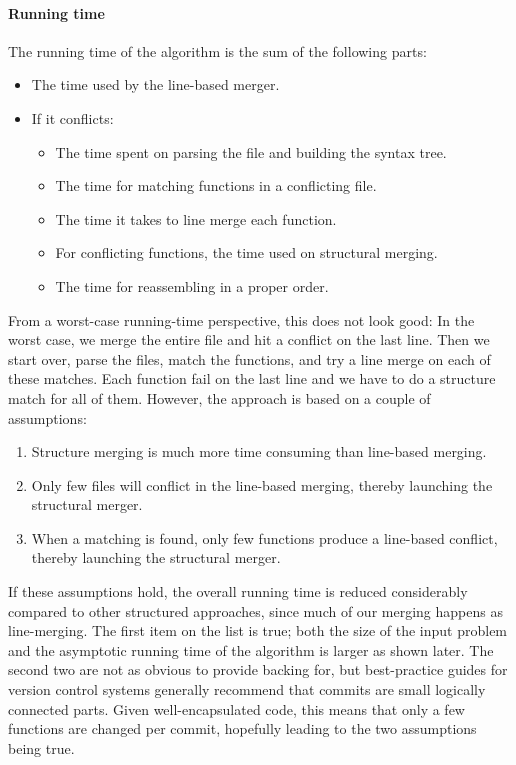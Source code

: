 \documentclass[11pt]{article}
\begin{document}
\paragraph{Running time} The running time of the algorithm is the sum of the following parts:

\begin{itemize}
\item The time used by the line-based merger.
\item If it conflicts:
\begin{itemize}
\item The time spent on parsing the file and building the syntax tree.
\item The time for matching functions in a conflicting file.
\item The time it takes to line merge each function.
\item For conflicting functions, the time used on structural merging.
\item The time for reassembling in a proper order.
\end{itemize}
\end{itemize}

From a worst-case running-time perspective, this does not look good: In the worst case, we merge the entire file and hit a conflict on the last line. Then we start over, parse the files, match the functions, and try a line merge on each of these matches. Each function fail on the last line and we have to do a structure match for all of them. However, the approach is based on a couple of assumptions:

\begin{enumerate}
	\item Structure merging is much more time consuming than line-based merging.
	\item Only few files will conflict in the line-based merging, thereby launching the structural merger.
	\item When a matching is found, only few functions produce a line-based conflict, thereby launching the structural merger.
\end{enumerate}

If these assumptions hold, the overall running time is reduced considerably compared to other structured approaches, since much of our merging happens as line-merging. The first item on the list is true; both the size of the input problem and the asymptotic running time of the algorithm is larger as shown later. The second two are not as obvious to provide backing for, but best-practice guides for version control systems generally recommend that commits are small logically connected parts. Given well-encapsulated code, this means that only a few functions are changed per commit, hopefully leading to the  two assumptions being true.
\end{document}
